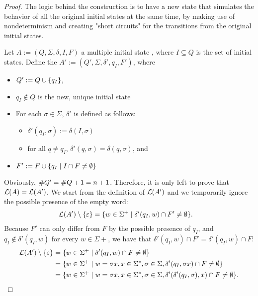 \begin{proof}
	The logic behind the construction is to have a new state that simulates the behavior of all the original initial states at the same time, by making use of nondeterminism and creating "short circuits" for the transitions from the original initial states.

	Let $A:=(Q,\Sigma,\delta,I,F)$ a multiple initial state \ONFA, where $I\subseteq Q$ is the set of initial states.
	Define the \ONFA $A':=(Q',\Sigma,\delta',q_I,F')$, where
	\begin{itemize}
		\item $Q':=Q\cup\{q_I\}$,
		\item $q_I\notin Q$ is the new, unique initial state
		\item For each $\sigma\in\Sigma$, $\delta'$ is defined as follows:
		      \begin{itemize}
			      \item $\delta'(q_I,\sigma):=\delta(I,\sigma)$
			      \item for all $q\ne q_I$, $\delta'(q,\sigma)=\delta(q,\sigma)$, and
		      \end{itemize}
		\item $F':=F\cup\{q_I\mid I\cap F\ne\emptyset\}$
	\end{itemize}
	Obviously, $\# Q'=\# Q+1=n+1$. Therefore, it is only left to prove that $\mathcal L(A)=\mathcal L(A')$.
	We start from the definition of $\mathcal L(A')$ and we temporarily ignore the possible presence of the empty word:
	\begin{align*}
		\mathcal L(A')\setminus\{\varepsilon\} & = \{w\in\Sigma^+\mid \delta'(q_I,w)\cap F'\ne\emptyset\} \text.
	\end{align*}
	Because $F'$ can only differ from $F$ by the possible presence of $q_I$, and $q_I\notin\delta'(q_I,w)$ for every $w\in\Sigma\plus$, we have that $\delta'(q_I,w)\cap F'=\delta'(q_I,w)\cap F$:
	\begin{align*}
		\genlang(A')\setminus\set{\emptyword} & = \set{w\in\Sigma\plus\mid \delta'(q_I,w)\cap F\ne\emptyset}                                                                    \\
		                                      & = \set{w\in\Sigma\plus\mid w=\sigma x, x\in\Sigma\star,\sigma\in\Sigma,\delta'(q_I,\sigma x)\cap F\ne\emptyset}                 \\
		                                      & = \set{w\in\Sigma\plus\mid w=\sigma x, x\in\Sigma\star,\sigma\in\Sigma,\delta'(\delta'(q_I,\sigma),x)\cap F\ne\emptyset} \text.

\end{align*}
\end{proof}
